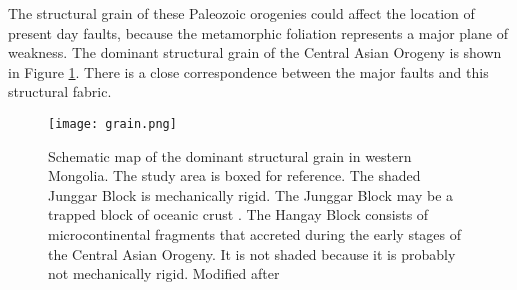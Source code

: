 The structural grain of these Paleozoic orogenies could affect the location of present day faults, because the metamorphic foliation represents a major plane of weakness. The dominant structural grain of the Central Asian Orogeny is shown in Figure \ref{grain}. There is a close correspondence between the major faults and this structural fabric. 

\begin{figure}[h!]
  \centering
  \texttt{[image: grain.png]}
  \caption{Schematic map of the dominant structural grain in western Mongolia. The study area is boxed for reference. The shaded Junggar Block is mechanically rigid. The Junggar Block may be a trapped block of oceanic crust \citep{Carroll1990a}.  The Hangay Block consists of microcontinental fragments that accreted during the early stages of the Central Asian Orogeny. It is not shaded because it is probably not mechanically rigid.  Modified after \citet{Cunningham2005a}}
  \label{grain}
\end{figure}
\clearpage

